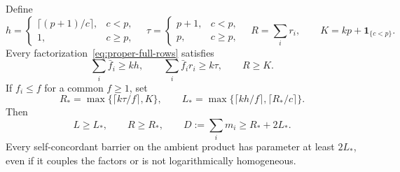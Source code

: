 \begin{theorem}\label{thm:face-sharing-global}
Define
\[
 h=\begin{cases}\lceil(p+1)/c\rceil,&c<p,\\1,&c\geq p,\end{cases}
 \quad
 \tau=\begin{cases}p+1,&c<p,\\p,&c\geq p,\end{cases}
 \quad R=\sum_i r_i,\qquad K=kp+\mathbf1_{\{c<p\}}.
\]
Every factorization~\eqref{eq:proper-full-rows} satisfies
\begin{equation}\label{eq:face-global-budgets}
 \sum_i\bar f_i\geq kh,\qquad
 \sum_i\bar f_i r_i\geq k\tau,\qquad R\geq K.
\end{equation}
If $f_i\leq f$ for a common $f\geq1$, set
\[
 R_*=\max\{\lceil k\tau/f\rceil,K\},\qquad
 L_*=\max\{\lceil kh/f\rceil,\lceil R_*/c\rceil\}.
\]
Then
\begin{equation}\label{eq:face-global-dimension}
 L\geq L_*,\qquad R\geq R_*,\qquad
 D:=\sum_i m_i\geq R_*+2L_*.
\end{equation}
Every self-concordant barrier on the ambient product has parameter
at least $2L_*$, even if it couples the factors or is not
logarithmically homogeneous.
\end{theorem}
